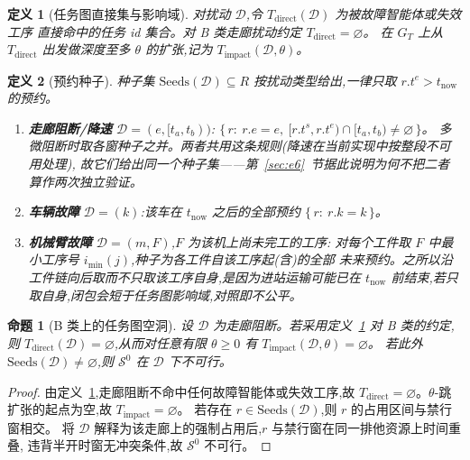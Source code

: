 \documentclass[manuscript,screen,review]{acmart}
\newtheorem{definition}{定义}
\newtheorem{prop}{命题}
\begin{document}
\begin{definition}[任务图直接集与影响域]
\label{def:task_impact}
对扰动 \(\mathcal{D}\),令 \(T_{\mathrm{direct}}(\mathcal{D})\) 为被故障智能体或失效工序
直接命中的任务 id 集合。对 B 类走廊扰动约定 \(T_{\mathrm{direct}}=\varnothing\)。
在 \(G_T\) 上从 \(T_{\mathrm{direct}}\) 出发做深度至多 \(\theta\) 的扩张,记为
\(T_{\mathrm{impact}}(\mathcal{D},\theta)\)。
\end{definition}

\begin{definition}[预约种子]
\label{def:seeds}
种子集 \(\mathrm{Seeds}(\mathcal{D})\subseteq R\) 按扰动类型给出,一律只取
\(r.t^e>t_{\mathrm{now}}\) 的预约。
\begin{enumerate}[label=(\alph*),leftmargin=1.6em,itemsep=0.15em]
\item \textbf{走廊阻断/降速} \(\mathcal{D}=(e,[t_a,t_b))\):
\(\{\,r:\ r.e=e,\ [r.t^s,r.t^e)\cap[t_a,t_b)\neq\varnothing\,\}\)。
多微阻断时取各窗种子之并。两者共用这条规则(降速在当前实现中按整段不可用处理),
故它们给出同一个种子集——第~\ref{sec:e6}~节据此说明为何不把二者算作两次独立验证。
\item \textbf{车辆故障} \(\mathcal{D}=(k)\):该车在 \(t_{\mathrm{now}}\) 之后的全部预约
\(\{\,r:\ r.k=k\,\}\)。
\item \textbf{机械臂故障} \(\mathcal{D}=(m,F)\),\(F\) 为该机上尚未完工的工序:
对每个工件取 \(F\) 中最小工序号 \(i_{\min}(j)\),种子为各工件自该工序起(含)的全部
未来预约。之所以沿工件链向后取而不只取该工序自身,是因为进站运输可能已在
\(t_{\mathrm{now}}\) 前结束,若只取自身,闭包会短于任务图影响域,对照即不公平。
\end{enumerate}
\end{definition}

\begin{prop}[B 类上的任务图空洞]
\label{prop:miss}
设 \(\mathcal{D}\) 为走廊阻断。若采用定义~\ref{def:task_impact} 对 B 类的约定,则
\(T_{\mathrm{direct}}(\mathcal{D})=\varnothing\),从而对任意有限 \(\theta\ge 0\) 有
\(T_{\mathrm{impact}}(\mathcal{D},\theta)=\varnothing\)。
若此外 \(\mathrm{Seeds}(\mathcal{D})\neq\varnothing\),则 \(\mathcal{S}^0\) 在 \(\mathcal{D}\) 下不可行。
\end{prop}

\begin{proof}
由定义~\ref{def:task_impact},走廊阻断不命中任何故障智能体或失效工序,故
\(T_{\mathrm{direct}}=\varnothing\)。\(\theta\)-跳扩张的起点为空,故
\(T_{\mathrm{impact}}=\varnothing\)。
若存在 \(r\in\mathrm{Seeds}(\mathcal{D})\),则 \(r\) 的占用区间与禁行窗相交。
将 \(\mathcal{D}\) 解释为该走廊上的强制占用后,\(r\) 与禁行窗在同一排他资源上时间重叠,
违背半开时窗无冲突条件,故 \(\mathcal{S}^0\) 不可行。
\end{proof}
\end{document}
